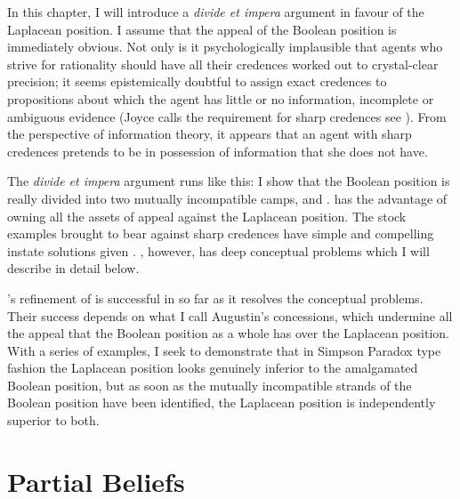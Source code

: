 \documentclass[phd,12pt,oneside]{ubcthesis}
\begin{document}

In this chapter, I will introduce a \emph{divide et impera}
argument in favour of the Laplacean position. I assume that the appeal
of the Boolean position is immediately obvious. Not only is it
psychologically implausible that agents who strive for rationality
should have all their credences worked out to crystal-clear precision;
it seems epistemically doubtful to assign exact credences to
propositions about which the agent has little or no information,
incomplete or ambiguous evidence (Joyce calls the requirement for
sharp credences  see ). From
the perspective of information theory, it appears that an agent with
sharp credences pretends to be in possession of information that she
does not have.

The \emph{divide et impera} argument runs like this: I show that the
Boolean position is really divided into two mutually incompatible
camps, {\anderson} and {\augustin}. {\anderson} has the advantage of
owning all the assets of appeal against the Laplacean position. The
stock examples brought to bear against sharp credences have simple and
compelling instate solutions given {\anderson}. {\anderson}, however,
has deep conceptual problems which I will describe in detail below.

{\augustin}'s refinement of {\anderson} is successful in so far as it
resolves the conceptual problems. Their success depends on what I call
Augustin's concessions, which undermine all the appeal that the
Boolean position as a whole has over the Laplacean position. With a
series of examples, I seek to demonstrate that in Simpson Paradox type
fashion the Laplacean position looks genuinely inferior to the
amalgamated Boolean position, but as soon as the mutually incompatible
strands of the Boolean position have been identified, the Laplacean
position is independently superior to both.

\section{Partial Beliefs}
\label{sec:taishiev}
\end{document}
